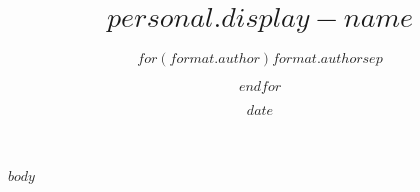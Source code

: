 \documentclass[]{article}
\title{$personal.display-name$}
\author{$for(format.author)$$format.author$$sep$\and $endfor$}
\date{$date$}
\begin{document}
  \maketitle

$body$
\end{document}
